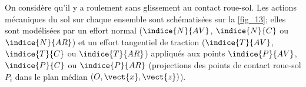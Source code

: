 %
%
%
%
%
%
%



\ifprof
\else
On considère qu'il y a roulement sans glissement au contact roue-sol. Les actions mécaniques du
sol sur chaque ensemble sont schématisées sur la \autoref{fig_13}; elles sont modélisées par un effort
normal ($\indice{N}{AV}$, $\indice{N}{C}$ ou $\indice{N}{AR}$) et un effort tangentiel de traction ($\indice{T}{AV}$, $\indice{T}{C}$ ou $\indice{T}{AR}$) appliqués aux
points $\indice{P}{AV}$, $\indice{P}{C}$ ou $\indice{P}{AR}$ (projections des points de contact roue-sol $P_i$ dans le plan médian $\left(O,\vect{x},\vect{z}\right)$).

